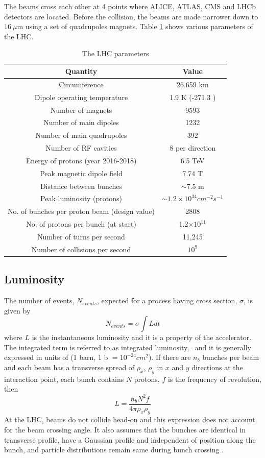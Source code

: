 The beams cross each other at 4 points where ALICE, ATLAS, CMS and LHCb detectors are located. Before the collision, the beams are made 
narrower down to $16\ \mu$m using a set of quadrupoles magnets. Table \ref{tab:LHCparms} shows various parameters of the LHC.
\begin{table}[h!]
\centering
\caption[The LHC parameters]{The LHC parameters \cite{LHCfaq}}
\label{tab:LHCparms}
\begin{tabular}{|c|c|}
\hline  
Quantity			&	Value  \\ \hline
Circumference  &	26.659 km  \\ 
Dipole operating temperature	&	1.9 K (-271.3 \textcelsius) \\
Number of magnets	&	9593 \\
Number of main dipoles	&	1232 \\
Number of main quadrupoles	&	392 \\
Number of RF cavities	&	8 per direction \\
Energy of protons (year 2016-2018)	&	6.5 TeV\\
Peak magnetic dipole field &	7.74 T\\
Distance between bunches	&	$\sim 7.5$ m\\
Peak luminosity (protons)	&	$\sim 1.2\times 10^{34} cm^{-2}s^{-1}$\\
No. of bunches per proton beam (design value)	&	2808\\
No. of protons per bunch (at start)	&	1.2$\times10^{11}$\\
Number of turns per second &	11,245 \\
Number of collisions per second	&	$10^9$\\\hline 
\end{tabular} 
\end{table}
\subsection{Luminosity}
The number of events, $N_{events}$, expected for a process having cross section, $\sigma$, is given by
\begin{equation}
N_{events} = \sigma\int Ldt
\end{equation}
where $L$ is the instantaneous luminosity and it is a property of the accelerator. The integrated term is referred to as integrated 
luminosity, \lumi\ and it is generally expressed in units of \fbinv (1 barn, 1 b $= 10^{-24}cm^{2}$).
If there are $n_b$ bunches per beam and each beam has a transverse spread of $\rho_{x}$, $\rho_y$ in $x$ and $y$ directions at the 
interaction point, each bunch contains $N$ protons, $f$ is the frequency of revolution, then
\begin{equation}
L = \frac{n_b N^2f}{4\pi\rho_x \rho_y}
\end{equation}
At the LHC, beams do not collide head-on and this expression does not account for the beam crossing angle.
It also assumes that the bunches are identical in transverse profile, 
have a Gaussian profile and independent of position along the bunch, and particle distributions remain same during bunch crossing \cite{Patrignani:2016xqp}.

